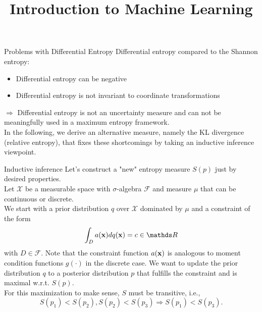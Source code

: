 \documentclass[11pt,compress,t,notes=noshow, xcolor=table]{beamer}
\title{Introduction to Machine Learning}
\date{}
\begin{document}

\begin{vbframe} {Problems with Differential Entropy}
Differential entropy compared to the Shannon entropy:
\begin{itemize}
    \item Differential entropy can be negative
    \item Differential entropy is not invariant to coordinate transformations
\end{itemize}
$\Rightarrow$ Differential entropy is not an uncertainty measure and can not be meaningfully used in a maximum entropy framework. \\
\lz 
In the following, we derive an alternative measure, namely the KL divergence (relative entropy), that fixes these shortcomings by taking an inductive inference viewpoint.  
\end{vbframe}
\begin{vbframe}{Inductive inference}
    Let's construct a "new" entropy measure $S(p)$ just by desired properties.\\
    \lz
    Let $\mathcal{X}$ be a measurable space with $\sigma$-algebra $\mathcal{F}$ and measure $\mu$ that can be continuous or discrete. \\
    We start with a prior distribution $q$ over $\mathcal{X}$ dominated by $\mu$ and a constraint of the form $$\int_D a(\xv) dq(\xv) = c \in \R$$
    with $D \in \mathcal{F}.$ Note that the constraint function $a(\mathbf{x})$ is analogous to moment condition functions $g(\cdot)$ in the discrete case.
    We want to update the prior distribution $q$ to a posterior distribution $p$ that fulfills the constraint and is maximal w.r.t. $S(p).$  \\
    \lz
    For this maximization to make sense, $S$ must be transitive, i.e., 
    $$S(p_1) < S(p_2), S(p_2) < S(p_3) \Rightarrow S(p_1) < S(p_3).$$
\end{vbframe}
\end{document}
